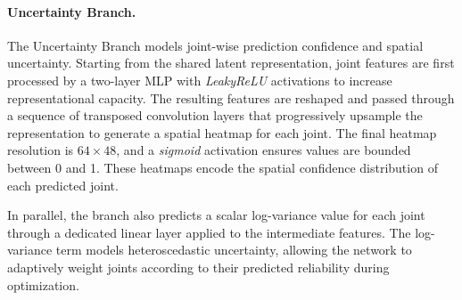 \paragraph{Uncertainty Branch.}
The Uncertainty Branch models joint-wise prediction confidence and spatial uncertainty. Starting from the shared latent representation, joint features are first processed by a two-layer MLP with \textit{LeakyReLU} activations to 
increase representational capacity.
The resulting features are reshaped and passed through a sequence of transposed convolution layers that progressively upsample the representation to generate a spatial heatmap for each joint. The final heatmap resolution is 
$64 \times 48$, and a \textit{sigmoid} activation ensures values are bounded between 0 and 1. These heatmaps encode the spatial confidence distribution of each predicted joint.

In parallel, the branch also predicts a scalar log-variance value for each joint through a dedicated linear layer applied to the intermediate features. The log-variance term models heteroscedastic uncertainty, allowing the network to 
adaptively weight joints according to their predicted reliability during optimization.


